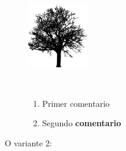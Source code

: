 \documentclass[
  letterpaper,
  DIV=11,
  numbers=noendperiod]{scrartcl}
\providecommand{\tightlist}{%
  \setlength{\itemsep}{0pt}\setlength{\parskip}{0pt}}\usepackage{longtable,booktabs,array}
\begin{document}
\begin{figure}

\begin{minipage}{0.40\linewidth}
\includegraphics[width=1.04167in,height=\textheight,keepaspectratio]{tree_01.png}\end{minipage}%
%
\begin{minipage}{0.20\linewidth}
~\end{minipage}%
%
\begin{minipage}{0.40\linewidth}

\begin{enumerate}
\def\labelenumi{\arabic{enumi}.}
\tightlist
\item
  Primer comentario
\item
  Segundo \textbf{comentario}
\end{enumerate}

\end{minipage}%

\end{figure}%

O variante 2:
\end{document}
